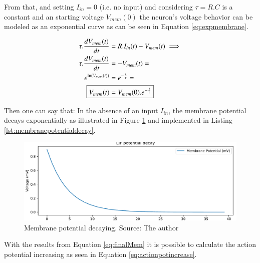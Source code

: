 			\par From that, and setting $I_{in} = 0$ (i.e. no input) and considering $\tau = R.C$ is a constant and an starting voltage $V_{mem}(0)$ the neuron's voltage behavior can be modeled as an exponential curve as can be seen in Equation \ref{eq:expmembrane}.
		
		 	\begin{equation}
		 		\label{eq:expmembrane}
		 		\begin{aligned}
		 		\tau.\dfrac{dV_{mem}(t)}{dt} &= R.I_{in}(t) - V_{mem}(t) \implies \\
		 		\tau.\dfrac{dV_{mem}(t)}{dt} &= -V_{mem}(t) = \\
		 		e^{\ln(V_{mem}(t))} &= e^{-\frac{t}{\tau}} = \\
		 		\Aboxed{V_{mem}(t) &= V_{mem}(0).e^{-\frac{t}{\tau}}}
		 		\end{aligned}
		 	\end{equation}
	 	
	 		\par Then one can say that: In the absence of an input $I_{in}$, the membrane potential decays exponentially as illustrated in Figure \ref{fig:membranepotentialdecay} and implemented in Listing \ref{lst:membranepotentialdecay}.
	 		
	 		\begin{multicols}{2}
	 			
	 		\columnbreak
		 		\begin{figure}[H]
		 			\centering
		 			\includegraphics[width=\linewidth]{images/membranePotentialDecay}
		 			\caption{Membrane potential decaying. Source: The author}
		 			\label{fig:membranepotentialdecay}
		 		\end{figure}
	 		\end{multicols}
 			
 			\par With the results from Equation \ref{eq:finalMem} it is possible to calculate the action potential increasing as seen in Equation \ref{eq:actionpotincrease}.
 			
